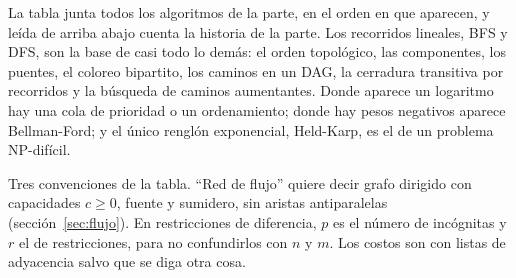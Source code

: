 \documentclass[11pt,letterpaper]{article}
\begin{document}
La tabla junta todos los algoritmos de la parte, en el orden en que
aparecen, y leída de arriba abajo cuenta la historia de la parte. Los
recorridos lineales, BFS y DFS, son la base de casi todo lo demás: el
orden topológico, las componentes, los puentes, el coloreo bipartito,
los caminos en un DAG, la cerradura transitiva por recorridos y la
búsqueda de caminos aumentantes. Donde aparece un logaritmo hay una
cola de prioridad o un ordenamiento; donde hay pesos negativos aparece
Bellman-Ford; y el único renglón exponencial, Held-Karp, es el de un
problema NP-difícil.

Tres convenciones de la tabla. ``Red de flujo'' quiere decir grafo
dirigido con capacidades $c \ge 0$, fuente y sumidero, sin aristas
antiparalelas (sección~\ref{sec:flujo}). En restricciones de
diferencia, $p$ es el número de incógnitas y $r$ el de restricciones,
para no confundirlos con $n$ y $m$. Los costos son con listas de
adyacencia salvo que se diga otra cosa.
\end{document}
